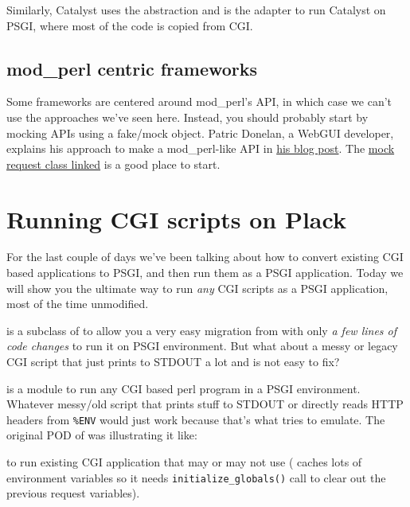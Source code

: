 Similarly, Catalyst uses the  abstraction and
\href{http://search.cpan.org/perldoc?Catalyst::Engine::PSGI}{}
is the adapter to run Catalyst on PSGI, where most of the code is copied
from CGI.

\section{mod\_perl centric
frameworks}\label{modux5fperl-centric-frameworks}

Some frameworks are centered around mod\_perl's API, in which case we
can't use the approaches we've seen here. Instead, you should probably
start by mocking  APIs using a fake/mock object. Patric
Donelan, a WebGUI developer, explains his approach to make a
mod\_perl-like API in
\href{http://blog.patspam.com/2009/plack-roundup-at-sf-pm}{his blog
post}. The
\href{http://github.com/pdonelan/webgui/blob/plebgui/lib/WebGUI/Session/Plack.pm}{mock
request class linked} is a good place to start.

\chapter{Running CGI scripts on
Plack}\label{day-9-running-cgi-scripts-on-plack}

For the last couple of days we've been talking about how to convert
existing CGI based applications to PSGI, and then run them as a PSGI
application. Today we will show you the ultimate way to run \emph{any}
CGI scripts as a PSGI application, most of the time unmodified.

\href{http://search.cpan.org/perldoc?CGI::PSGI}{} is a subclass
of  to allow you a very easy migration from  with only
\emph{a few lines of code changes} to run it on PSGI environment. But
what about a messy or legacy CGI script that just prints to STDOUT a lot
and is not easy to fix?

\href{http://search.cpan.org/perldoc?CGI::Emulate::PSGI}{}
is a module to run any CGI based perl program in a PSGI environment.
Whatever messy/old script that prints stuff to STDOUT or directly reads
HTTP headers from \lstinline!%ENV! would just work because that's what
 tries to emulate. The original POD of
 was illustrating it like:

%
to run existing CGI application that may or may not use  (
caches lots of environment variables so it needs
\lstinline!initialize_globals()! call to clear out the previous request
variables).

